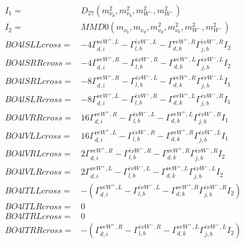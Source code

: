 \documentclass[A4,landscape]{article}
\begin{document}
\begin{align} 
I_1 = & D_{27}(m^2_{\nu_{{d}}}, m^2_{\nu_{{b}}}, m^2_{W^-}, m^2_{W^-}) \\ 
I_2 = & MMD0(m_{\nu_{{b}}}, m_{\nu_{{d}}}, m^2_{\nu_{{d}}}, m^2_{\nu_{{b}}}, m^2_{W^-}, m^2_{W^-}) \\ 
  BO4lSLLcross= & -4  \Gamma^{\nu e W^+,L}_{d, i} - \Gamma^{\bar{e}\nu W^- ,L} _{l, b} - \Gamma^{\nu e W^+,R} _{d, k} \Gamma^{\bar{e}\nu W^- ,R}_{j, b} I_2 \\ 
  BO4lSRRcross= & -4  \Gamma^{\nu e W^+,R}_{d, i} - \Gamma^{\bar{e}\nu W^- ,R} _{l, b} - \Gamma^{\nu e W^+,L} _{d, k} \Gamma^{\bar{e}\nu W^- ,L}_{j, b} I_2 \\ 
  BO4lSRLcross= & -8  \Gamma^{\nu e W^+,R}_{d, i} - \Gamma^{\bar{e}\nu W^- ,L} _{l, b} - \Gamma^{\nu e W^+,R} _{d, k} \Gamma^{\bar{e}\nu W^- ,L}_{j, b} I_1 \\ 
  BO4lSLRcross= & -8  \Gamma^{\nu e W^+,L}_{d, i} - \Gamma^{\bar{e}\nu W^- ,R} _{l, b} - \Gamma^{\nu e W^+,L} _{d, k} \Gamma^{\bar{e}\nu W^- ,R}_{j, b} I_1 \\ 
  BO4lVRRcross= & 16  \Gamma^{\nu e W^+,R}_{d, i} - \Gamma^{\bar{e}\nu W^- ,L} _{l, b} - \Gamma^{\nu e W^+,L} _{d, k} \Gamma^{\bar{e}\nu W^- ,R}_{j, b} I_1 \\ 
  BO4lVLLcross= & 16  \Gamma^{\nu e W^+,L}_{d, i} - \Gamma^{\bar{e}\nu W^- ,R} _{l, b} - \Gamma^{\nu e W^+,R} _{d, k} \Gamma^{\bar{e}\nu W^- ,L}_{j, b} I_1 \\ 
  BO4lVRLcross= & 2  \Gamma^{\nu e W^+,R}_{d, i} - \Gamma^{\bar{e}\nu W^- ,R} _{l, b} - \Gamma^{\nu e W^+,R} _{d, k} \Gamma^{\bar{e}\nu W^- ,R}_{j, b} I_2 \\ 
  BO4lVLRcross= & 2  \Gamma^{\nu e W^+,L}_{d, i} - \Gamma^{\bar{e}\nu W^- ,L} _{l, b} - \Gamma^{\nu e W^+,L} _{d, k} \Gamma^{\bar{e}\nu W^- ,L}_{j, b} I_2 \\ 
  BO4lTLLcross= & -( \Gamma^{\nu e W^+,L}_{d, i} - \Gamma^{\bar{e}\nu W^- ,L} _{l, b} - \Gamma^{\nu e W^+,R} _{d, k} \Gamma^{\bar{e}\nu W^- ,R}_{j, b} I_2) \\ 
  BO4lTLRcross= & 0 \\ 
  BO4lTRLcross= & 0 \\ 
  BO4lTRRcross= & -( \Gamma^{\nu e W^+,R}_{d, i} - \Gamma^{\bar{e}\nu W^- ,R} _{l, b} - \Gamma^{\nu e W^+,L} _{d, k} \Gamma^{\bar{e}\nu W^- ,L}_{j, b} I_2) \\ 
\end{align} 
\end{document}
